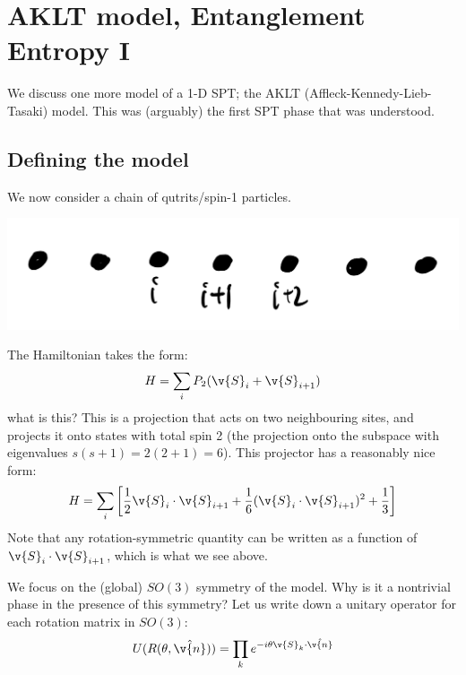 \section{AKLT model, Entanglement Entropy I}
We discuss one more model of a 1-D SPT; the AKLT (Affleck-Kennedy-Lieb-Tasaki) model. This was (arguably) the first SPT phase that was understood.

\subsection{Defining the model}
We now consider a chain of qutrits/spin-1 particles.

\begin{center}
    \includegraphics[scale=0.35]{Lectures/Images/lec15-spinchain.png}
\end{center}

The Hamiltonian takes the form:
\begin{equation}
    H = \sum_i P_2(\v{S}_i + \v{S}_{i+1})
\end{equation}
what is this? This is a projection that acts on two neighbouring sites, and projects it onto states with total spin 2 (the projection onto the subspace with eigenvalues $s(s+1) = 2(2+1) = 6$).  This projector has a reasonably nice form:
\begin{equation}
    H = \sum_i \left[\frac{1}{2}\v{S}_i \cdot \v{S}_{i+1} +\frac{1}{6}(\v{S}_i\cdot\v{S}_{i+1})^2 + \frac{1}{3}\right]
\end{equation}
Note that any rotation-symmetric quantity can be written as a function of $\v{S}_i \cdot \v{S}_{i+1}$, which is what we see above. 


We focus on the (global) $SO(3)$ symmetry of the model. Why is it a nontrivial phase in the presence of this symmetry? Let us write down a unitary operator for each rotation matrix in $SO(3)$:
\begin{equation}
    U(R(\theta, \hat{\v{n}})) = \prod_k e^{-i\theta \v{S}_k \cdot \hat{\v{n}}}
\end{equation}

